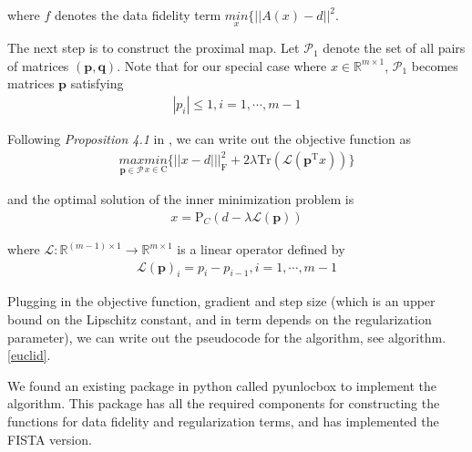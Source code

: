 \documentclass[12pt]{article}
\newcommand{\noin}{\noindent}
\begin{document}
\noin where $f$ denotes the data fidelity term $\underset{x}{min}\{ ||A(x) - d||^2$.

\vspace{0.2in}

\noin The next step is to construct the proximal map. Let $\mathcal{P}_1$ denote the set of all pairs of matrices $(\mathbf{p}, \mathbf{q})$. Note that for our special case where $x \in \mathbb{R}^{m \times 1}$, $\mathcal{P}_1$ becomes matrices $\mathbf{p}$ satisfying
\begin{align}
    |p_i| \leq 1, i = 1,\cdots,m-1
\end{align}

\noin Following \emph{Proposition 4.1} in \cite{Beck2009-id}, we can write out the objective function as 
\begin{align}
\underset{\mathbf{p} \in \mathcal{P}}{max} \underset{x \in \text{C}}{min}\{||x-d|||_\text{F}^2 + 2\lambda\text{Tr}(\mathcal{L}(\mathbf{p}^{\text{T}}x))\}
\end{align}

\noin and the optimal solution of the inner minimization problem is 
\begin{align}
    x = \text{P}_C(d - \lambda \mathcal{L}(\mathbf{p}))
\end{align}

\noin where $\mathcal{L}: \mathbb{R}^{(m-1)\times 1} \rightarrow \mathbb{R}^{m\times 1}$ is a linear operator defined by
\begin{align}
    \mathcal{L}(\mathbf{p})_{i} = p_i - p_{i-1}, i= 1,\cdots,m-1
\end{align}

\noin Plugging in the objective function, gradient and step size (which is an upper bound on the Lipschitz constant, and in term depends on the regularization parameter), we can write out the pseudocode for the algorithm, see algorithm.\ref{euclid}. 

\vspace{0.1in}

\noin We found an existing package in python called pyunlocbox \cite{pyunlocbox} to implement the algorithm. This package has all the required components for constructing the functions for data fidelity and regularization terms, and has implemented the FISTA version. 
\end{document}
